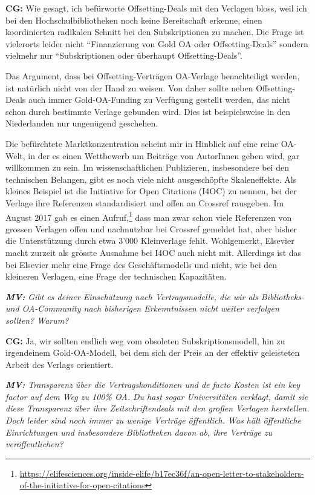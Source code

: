 \documentclass[a4paper,
fontsize=11pt,
oneside,
numbers=noperiodatend,
parskip=half-,
bibliography=totoc,
final
]{scrartcl}
\begin{document}
\textbf{CG:} Wie gesagt, ich befürworte Offsetting-Deals mit den
Verlagen bloss, weil ich bei den Hochschulbibliotheken noch keine
Bereitschaft erkenne, einen koordinierten radikalen Schnitt bei den
Subskriptionen zu machen. Die Frage ist vielerorts leider nicht
\enquote{Finanzierung von Gold OA oder Offsetting-Deals} sondern
vielmehr nur \enquote{Subskriptionen oder überhaupt Offsetting-Deals}.

Das Argument, dass bei Offsetting-Verträgen OA-Verlage benachteiligt
werden, ist natürlich nicht von der Hand zu weisen. Von daher sollte
neben Offsetting-Deals auch immer Gold-OA-Funding zu Verfügung gestellt
werden, das nicht schon durch bestimmte Verlage gebunden wird. Dies ist
beispielsweise in den Niederlanden nur ungenügend geschehen.

Die befürchtete Marktkonzentration scheint mir in Hinblick auf eine
reine OA-Welt, in der es einen Wettbewerb um Beiträge von AutorInnen
geben wird, gar willkommen zu sein. Im wissenschaftlichen Publizieren,
insbesondere bei den technischen Belangen, gibt es noch viele nicht
ausgeschöpfte Skaleneffekte. Als kleines Beispiel ist die Initiative for
Open Citations (I4OC) zu nennen, bei der Verlage ihre Referenzen
standardisiert und offen an Crossref rausgeben. Im August 2017 gab es
einen Aufruf,\footnote{\url{https://elifesciences.org/inside-elife/b17ec36f/an-open-letter-to-stakeholders-of-the-initiative-for-open-citations}}
dass man zwar schon viele Referenzen von grossen Verlagen offen und
nachnutzbar bei Crossref gemeldet hat, aber bisher die Unterstützung
durch etwa 3'000 Kleinverlage fehlt. Wohlgemerkt, Elsevier macht zurzeit
als grösste Ausnahme bei I4OC auch nicht mit. Allerdings ist das bei
Elsevier mehr eine Frage des Geschäftsmodells und nicht, wie bei den
kleineren Verlagen, eine Frage der technischen Kapazitäten.

\emph{\textbf{MV:} Gibt es deiner Einschätzung nach Vertragsmodelle, die
wir als Bibliotheks- und OA-Community nach bisherigen Erkenntnissen
nicht weiter verfolgen sollten? Warum?}

\textbf{CG:} Ja, wir sollten endlich weg vom obsoleten
Subskriptionsmodell, hin zu irgendeinem Gold-OA-Modell, bei dem sich der
Preis an der effektiv geleisteten Arbeit des Verlags orientiert.

\emph{\textbf{MV:} Transparenz über die Vertragskonditionen und de facto
Kosten ist ein key factor auf dem Weg zu 100\% OA. Du hast sogar
Universitäten verklagt, damit sie diese Transparenz über ihre
Zeitschriftendeals mit den großen Verlagen herstellen. Doch leider sind
noch immer zu wenige Verträge öffentlich. Was hält öffentliche
Einrichtungen und insbesondere Bibliotheken davon ab, ihre Verträge zu
veröffentlichen?}
\end{document}

